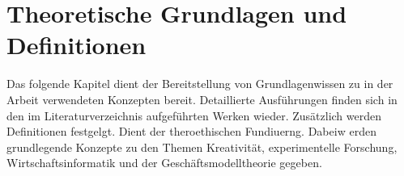 \chapter{Theoretische Grundlagen und Definitionen}

Das folgende Kapitel dient der Bereitstellung von Grundlagenwissen zu in der Arbeit verwendeten Konzepten bereit. Detaillierte Ausführungen finden sich in den im Literaturverzeichnis aufgeführten Werken wieder. Zusätzlich werden Definitionen festgelgt.
Dient der theroethischen Fundiuerng. Dabeiw erden grundlegende Konzepte zu den Themen Kreativität, experimentelle Forschung, Wirtschaftsinformatik und der Geschäftsmodelltheorie gegeben.


